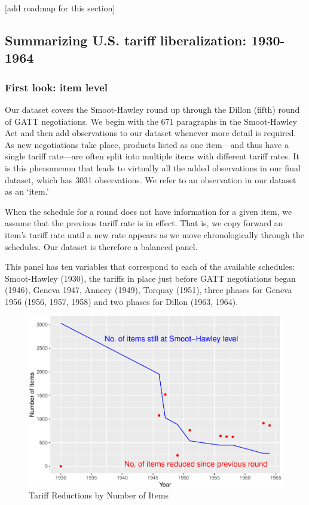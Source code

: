 \documentclass[
  12pt,
]{article}
\begin{document}
{[}add roadmap for this section{]}

\hypertarget{summarizing-u.s.-tariff-liberalization-1930-1964}{%
\subsection{Summarizing U.S. tariff liberalization: 1930-1964}\label{summarizing-u.s.-tariff-liberalization-1930-1964}}

\hypertarget{first-look-item-level}{%
\subsubsection{First look: item level}\label{first-look-item-level}}

Our dataset covers the Smoot-Hawley round up through the Dillon (fifth) round of GATT negotiations. We begin with the 671 paragraphs in the Smoot-Hawley Act and then add observations to our dataset whenever more detail is required. As new negotiations take place, products listed as one item---and thus have a single tariff rate---are often split into multiple items with different tariff rates. It is this phenomenon that leads to virtually all the added observations in our final dataset, which has 3031 observations. We refer to an observation in our dataset as an `item.'

When the schedule for a round does not have information for a given item, we assume that the previous tariff rate is in effect. That is, we copy forward an item's tariff rate until a new rate appears as we move chronologically through the schedules. Our dataset is therefore a balanced panel.

This panel has ten variables that correspond to each of the available schedules: Smoot-Hawley (1930), the tariffs in place just before GATT negotiations began (1946), Geneva 1947, Annecy (1949), Torquay (1951), three phases for Geneva 1956 (1956, 1957, 1958) and two phases for Dillon (1963, 1964).

\begin{figure}[!h]
\includegraphics{data-paper_files/figure-latex/ibi-1} \caption{Tariff Reductions by Number of Items}\label{fig:ibi}
\end{figure}
\end{document}
